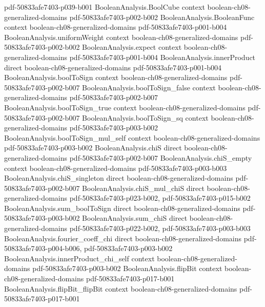 \begin{lemma}
  {pdf-50833afe7403-p039-b001}
\proofstep
  {BooleanAnalysis.BoolCube}
  {context}
  {boolean-ch08-generalized-domains}
  {pdf-50833afe7403-p002-b002}
\proofstep
  {BooleanAnalysis.BooleanFunc}
  {context}
  {boolean-ch08-generalized-domains}
  {pdf-50833afe7403-p001-b004}
\proofstep
  {BooleanAnalysis.uniformWeight}
  {context}
  {boolean-ch08-generalized-domains}
  {pdf-50833afe7403-p002-b002}
\proofstep
  {BooleanAnalysis.expect}
  {context}
  {boolean-ch08-generalized-domains}
  {pdf-50833afe7403-p001-b004}
\proofstep
  {BooleanAnalysis.innerProduct}
  {direct}
  {boolean-ch08-generalized-domains}
  {pdf-50833afe7403-p001-b004}
\proofstep
  {BooleanAnalysis.boolToSign}
  {context}
  {boolean-ch08-generalized-domains}
  {pdf-50833afe7403-p002-b007}
\proofstep
  {BooleanAnalysis.boolToSign_false}
  {context}
  {boolean-ch08-generalized-domains}
  {pdf-50833afe7403-p002-b007}
\proofstep
  {BooleanAnalysis.boolToSign_true}
  {context}
  {boolean-ch08-generalized-domains}
  {pdf-50833afe7403-p002-b007}
\proofstep
  {BooleanAnalysis.boolToSign_sq}
  {context}
  {boolean-ch08-generalized-domains}
  {pdf-50833afe7403-p003-b002}
\proofstep
  {BooleanAnalysis.boolToSign_mul_self}
  {context}
  {boolean-ch08-generalized-domains}
  {pdf-50833afe7403-p003-b002}
\proofstep
  {BooleanAnalysis.chiS}
  {direct}
  {boolean-ch08-generalized-domains}
  {pdf-50833afe7403-p002-b007}
\proofstep
  {BooleanAnalysis.chiS_empty}
  {context}
  {boolean-ch08-generalized-domains}
  {pdf-50833afe7403-p003-b003}
\proofstep
  {BooleanAnalysis.chiS_singleton}
  {direct}
  {boolean-ch08-generalized-domains}
  {pdf-50833afe7403-p002-b007}
\proofstep
  {BooleanAnalysis.chiS_mul_chiS}
  {direct}
  {boolean-ch08-generalized-domains}
  {pdf-50833afe7403-p023-b002,
    pdf-50833afe7403-p015-b002}
\proofstep
  {BooleanAnalysis.sum_boolToSign}
  {direct}
  {boolean-ch08-generalized-domains}
  {pdf-50833afe7403-p003-b002}
\proofstep
  {BooleanAnalysis.sum_chiS}
  {direct}
  {boolean-ch08-generalized-domains}
  {pdf-50833afe7403-p022-b002,
    pdf-50833afe7403-p003-b003}
\proofstep
  {BooleanAnalysis.fourier_coeff_chi}
  {direct}
  {boolean-ch08-generalized-domains}
  {pdf-50833afe7403-p004-b006,
    pdf-50833afe7403-p003-b002}
\proofstep
  {BooleanAnalysis.innerProduct_chi_self}
  {context}
  {boolean-ch08-generalized-domains}
  {pdf-50833afe7403-p003-b002}
\proofstep
  {BooleanAnalysis.flipBit}
  {context}
  {boolean-ch08-generalized-domains}
  {pdf-50833afe7403-p017-b001}
\proofstep
  {BooleanAnalysis.flipBit_flipBit}
  {context}
  {boolean-ch08-generalized-domains}
  {pdf-50833afe7403-p017-b001}

\end{lemma}

